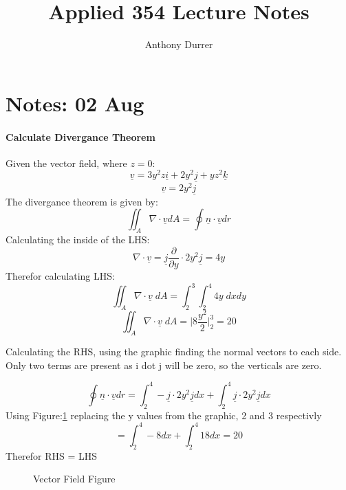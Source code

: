 \documentclass[12pt, letterpaper]{article}
\title{Applied 354 Lecture Notes}
\author{Anthony Durrer}
\newcommand{\un}[1]{\underline{#1}}
\newcommand{\partFrac}[2]{\frac{\partial #1}{\partial #2}}
\begin{document}
	\maketitle

	\section{Notes: 02 Aug}
	\paragraph{Calculate Divergance Theorem}
		Given the vector field, where $z=0$:
		\begin{equation}
			\underline{v}=3y^{2}z\underline{i} + 2y^{2}\underline{j} + yz^{2}\underline{k}
		\end{equation}
		\begin{equation}
			\underline{v} = 2y^{2}\underline{j}
		\end{equation}
		The divergance theorem is given by:
		\begin{equation}
			\iint_A \nabla \cdot \underline{v} dA  = \oint \underline{n} \cdot \underline{v} dr
		\end{equation}
		Calculating the inside of the LHS:
		\begin{equation}
			\nabla \cdot \un{v} = \un{j} \partFrac{}{y} \cdot 2y^{2} \un{j} = 4y
		\end{equation}
		Therefor calculating LHS:
		\begin{equation}
			\iint_A \nabla \cdot \underline{v} \; dA  = \int_{2}^{3} \int_2^4 4y \;dxdy
		\end{equation}
		\begin{equation}
			\iint_A \nabla \cdot \underline{v} \; dA  = \Big| 8 \frac{y^2}{2} \Big|_2^3 = 20
		\end{equation}

		Calculating the RHS, using the graphic finding the normal vectors to each side. Only two terms
		are present as i dot j will be zero, so the verticals are zero.

		\begin{equation}
			\oint \underline{n} \cdot \underline{v} dr = \int_2^4 -\un{j} \cdot 2y^2\un{j} dx + \int_2^4 \un{j} \cdot 2y^2\un{j} dx 
		\end{equation}
		Using Figure:\ref{fg:1} replacing the y values from the graphic, 2 and 3 respectivly
		\begin{equation}
			= \int_2^4 -8 dx + \int_2^4 18 dx = 20
		\end{equation}
		Therefor RHS = LHS
		\begin{figure}[h]
			\centering
			\caption{Vector Field Figure}
			\label{fg:1}
		\end{figure}
\end{document}
